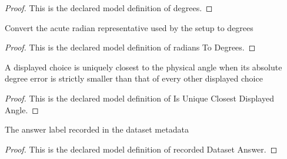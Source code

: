 \begin{proof}
  This is the declared model definition of degrees.
\end{proof}
\begin{definition}
  \label{def:physics:phyx-mini-0905:phyxminiproblems-problemphyxmini0905-radianstodegrees}
  Convert the acute radian representative used by the setup to degrees
\end{definition}
\begin{proof}
  This is the declared model definition of radians To Degrees.
\end{proof}
\begin{definition}
  \label{def:physics:phyx-mini-0905:phyxminiproblems-problemphyxmini0905-isuniqueclosestdisplayedangle}
  A displayed choice is uniquely closest to the physical angle when its absolute degree error is strictly smaller than that of every other displayed choice
\end{definition}
\begin{proof}
  This is the declared model definition of Is Unique Closest Displayed Angle.
\end{proof}
\begin{definition}
  \label{def:physics:phyx-mini-0905:phyxminiproblems-problemphyxmini0905-recordeddatasetanswer}
  The answer label recorded in the dataset metadata
\end{definition}
\begin{proof}
  This is the declared model definition of recorded Dataset Answer.
\end{proof}
